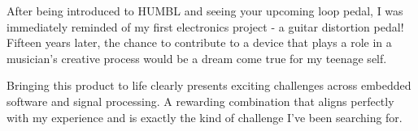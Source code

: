 \documentclass[11pt, a4paper]{awesome-cv}
\begin{document}
\begin{cvletter}
After being introduced to HUMBL and seeing your upcoming loop pedal, I was immediately reminded of my first electronics project - a guitar distortion pedal! Fifteen years later, the chance to contribute to a device that plays a role in a musician’s creative process would be a dream come true for my teenage self.

Bringing this product to life clearly presents exciting challenges across embedded software and signal processing. A rewarding combination that aligns perfectly with my experience and is exactly the kind of challenge I've been searching for.





\end{cvletter}
\end{document}
